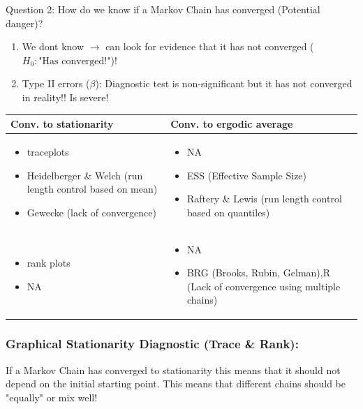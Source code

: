 \documentclass{article}\usepackage[]{graphicx}\usepackage[]{xcolor}
\begin{document}
\begin{multicols*}{2}
Question 2: How do we know if a Markov Chain has converged (Potential danger)?
\begin{enumerate}
\item We dont know $\rightarrow$ can look for evidence that it has not converged ($H_0:\text{"Has converged!"}$)!
\item Type II errors ($\beta$): Diagnostic test is non-significant but it has not converged in reality!! Is severe!
\end{enumerate}

\setlength\tabcolsep{0.1pt} %
\setlength{\extrarowheight}{-10pt}
\begin{tabular}{|p{4.5cm}|p{4.5cm}|}
  \hline
  Conv. to stationarity & Conv. to ergodic average\\
  \hline
  \begin{itemize} 
  \item traceplots
  \item Heidelberger \& Welch (run length control based on mean)
  \item Gewecke (lack of convergence)
  \end{itemize} 
  &
  \begin{itemize} 
  \item NA
  \item ESS (Effective Sample Size)
  \item Raftery \& Lewis (run length control based on quantiles)
  \end{itemize} 
  \\  \hline
  \begin{itemize} 
  \item rank plots
  \item NA
  \end{itemize} 
  &
  \begin{itemize} 
  \item NA
  \item BRG (Brooks, Rubin, Gelman),R (Lack of convergence using multiple chains)
  \end{itemize} 
  \\
  \hline
\end{tabular}

\subsubsection{Graphical Stationarity Diagnostic (Trace \& Rank):}

If a Markov Chain has converged to stationarity this means that it should not depend on the initial starting point. This means that different chains should be "equally" or mix well! 


\end{multicols*}
\end{document}
